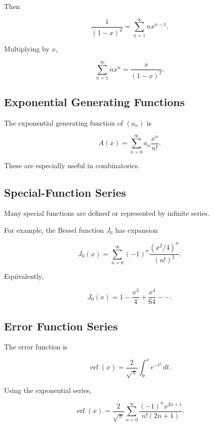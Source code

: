Then

\[
\boxed{
\frac{1}{(1-x)^2}
=
\sum_{n=1}^{\infty}
nx^{n-1}.
}
\]

Multiplying by \(x\),

\[
\boxed{
\sum_{n=1}^{\infty}
nx^n
=
\frac{x}{(1-x)^2}.
}
\]

\subsection{Exponential Generating Functions}
\label{subsec:exponential-generating-functions-reference}

The exponential generating function of \((a_n)\) is

\[
\boxed{
A(x)
=
\sum_{n=0}^{\infty}
a_n
\frac{x^n}{n!}.
}
\]

These are especially useful in combinatorics.

\subsection{Special-Function Series}
\label{subsec:special-function-series-reference}

Many special functions are defined or represented by infinite series.

For example, the Bessel function \(J_0\) has expansion

\[
\boxed{
J_0(x)
=
\sum_{n=0}^{\infty}
(-1)^n
\frac{
(x^2/4)^n
}{
(n!)^2
}.
}
\]

Equivalently,

\[
\boxed{
J_0(x)
=
1
-
\frac{x^2}{4}
+
\frac{x^4}{64}
-\cdots.
}
\]

\subsection{Error Function Series}
\label{subsec:error-function-series-reference}

The error function is

\[
\boxed{
\operatorname{erf}(x)
=
\frac{2}{\sqrt{\pi}}
\int_0^x
e^{-t^2}
\,dt.
}
\]

Using the exponential series,

\[
\boxed{
\operatorname{erf}(x)
=
\frac{2}{\sqrt{\pi}}
\sum_{n=0}^{\infty}
\frac{
(-1)^n x^{2n+1}
}{
n!(2n+1)
}.
}
\]

